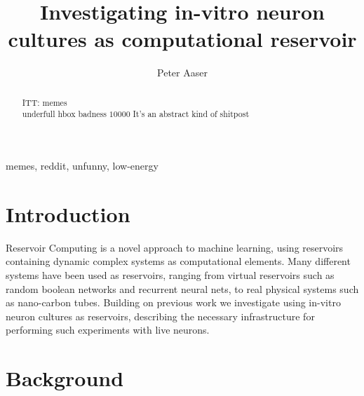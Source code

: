 \documentclass[journal]{IEEEtran}
\begin{document}
\title{Investigating in-vitro neuron cultures as computational reservoir}

\author{Peter Aaser}
%
\maketitle


\begin{abstract}
  ITT: memes\\
  underfull hbox badness $10000$
  It's an abstract kind of shitpost
\end{abstract}


\begin{IEEEkeywords}
memes, reddit, unfunny, low-energy
\end{IEEEkeywords}

\section{Introduction}
Reservoir Computing is a novel approach to machine learning, using reservoirs
containing dynamic complex systems as computational elements. 
\cite{schrauwen_overview_2007}
Many different systems have been used as reservoirs, ranging from
virtual reservoirs such as random boolean networks and recurrent neural nets,
to real physical systems such as nano-carbon tubes.
Building on previous work we investigate using in-vitro neuron cultures as
reservoirs, describing the necessary infrastructure for performing such
experiments with live neurons.

\section{Background}
\end{document}
